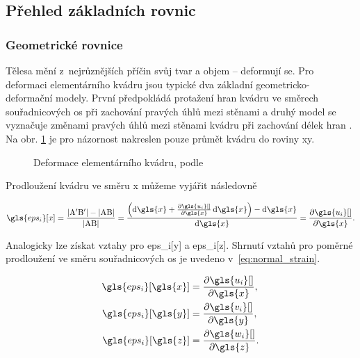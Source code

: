 \subsection{Přehled základních rovnic}

\subsubsection*{Geometrické rovnice}
Tělesa mění z~nejrůznějších příčin svůj tvar a objem -- deformují se. Pro deformaci elementárního kvádru jsou typické dva základní geometricko-deformační modely. První předpokládá protažení hran kvádru ve směrech souřadnicových os při zachování pravých úhlů mezi stěnami a druhý model se vyznačuje změnami pravých úhlů mezi stěnami kvádru při zachování délek hran \cite[9]{prpe10}. Na obr. \ref{fig:elementary_block} je pro názornost nakreslen pouze průmět kvádru do roviny \gls{x}\gls{y}.

\begin{figure}[H]
    
    \caption[Deformace elementárního kvádru]{Deformace elementárního kvádru, podle \cite[obr. 1.2]{teorie_pruznosti}}
    \label{fig:elementary_block}
\end{figure}

Prodloužení kvádru ve směru \gls{x} můžeme vyjářit následovně

\begin{equation}
    \gls{eps_i}[x] 
    = 
    \frac{|\mathrm{A'B'}| - |\mathrm{AB}|}{|\mathrm{AB}|}
    =
    \frac{\left(\dd{\gls{x}} + \pdv{\gls{u_i}[ ]}{\gls{x}} \dd{\gls{x}}\right) - \dd{\gls{x} }}{\dd{\gls{x}}}
    =
    \pdv{\gls{u_i}[ ]}{\gls{x}}.
\end{equation}

Analogicky lze získat vztahy pro \gls{eps_i}[\gls{y}] a \gls{eps_i}[\gls{z}]. Shrnutí vztahů pro poměrné prodloužení ve směru souřadnicových os je uvedeno v~\ref{eq:normal_strain}.

\begin{equation}
    \label{eq:normal_strain}
    \begin{aligned}
        \gls{eps_i}[\gls{x}] & = \pdv{\gls{u_i}[ ]}{\gls{x}}, \\
        \gls{eps_i}[\gls{y}] & = \pdv{\gls{v_i}[ ]}{\gls{y}}, \\
        \gls{eps_i}[\gls{z}] & = \pdv{\gls{w_i}[ ]}{\gls{z}}.
    \end{aligned}
\end{equation}

